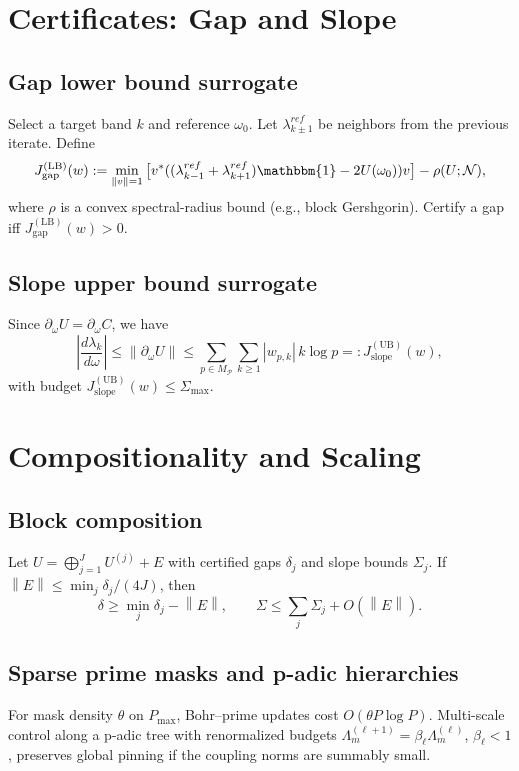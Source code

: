 \documentclass[11pt]{article}
\theoremstyle{plain}
\theoremstyle{definition}
\newcommand{\PP}{\mathcal{P}}
\newcommand{\Id}{\mathbbm{1}}
\newcommand{\norm}[1]{\left\lVert #1 \right\rVert}
\newcommand{\LB}{\mathrm{LB}}
\newcommand{\UB}{\mathrm{UB}}
\newcommand{\Jgap}{J^{(\LB)}_{\text{gap}}}
\newcommand{\Jslope}{J^{(\UB)}_{\text{slope}}}
\begin{document}
\section{Certificates: Gap and Slope}\label{sec:certs}
\subsection{Gap lower bound surrogate}
Select a target band \(k\) and reference \(\omega_0\). Let \(\lambda^{ref}_{k\pm1}\) be neighbors from the previous iterate. Define
\begin{equation}
\Jgap(w):=\min_{\norm{v}=1}\big[ v^*((\lambda^{ref}_{k-1}+\lambda^{ref}_{k+1})\Id - 2U(\omega_0))v\big]-\rho(U;\mathcal{N}),
\end{equation}
where \(\rho\) is a convex spectral-radius bound (e.g., block Gershgorin). Certify a gap iff \(\Jgap(w)>0\).

\subsection{Slope upper bound surrogate}
Since \(\partial_\omega U=\partial_\omega C\), we have
\begin{equation}
\left|\frac{d\lambda_k}{d\omega}\right|\le \norm{\partial_\omega U}\le \sum_{p\in M_\PP}\sum_{k\ge 1}|w_{p,k}|\,k\log p =: \Jslope(w),
\end{equation}
with budget \(\Jslope(w)\le \Sigma_{\max}.\)

\section{Compositionality and Scaling}\label{sec:scaling}
\subsection{Block composition}
Let \(U=\bigoplus_{j=1}^J U^{(j)}+E\) with certified gaps \(\delta_j\) and slope bounds \(\Sigma_j\). If \(\norm{E}\le \min_j\delta_j/(4J)\), then
\begin{equation}
\delta\ge \min_j\delta_j-\norm{E},\qquad \Sigma\le \sum_j\Sigma_j+O(\norm{E}).
\end{equation}

\subsection{Sparse prime masks and p-adic hierarchies}
For mask density \(\theta\) on \(P_{\max}\), Bohr--prime updates cost \(O(\theta P\log P)\). Multi-scale control along a p-adic tree with renormalized budgets \(\Lambda_m^{(\ell+1)}=\beta_\ell\Lambda_m^{(\ell)}\), \(\beta_\ell<1\), preserves global pinning if the coupling norms are summably small.
\end{document}
